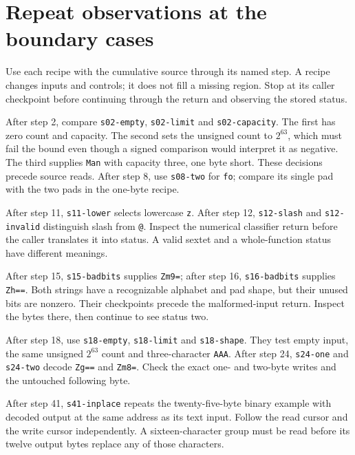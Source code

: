 \section{Repeat observations at the boundary cases}
Use each recipe with the cumulative source through its named step. A recipe changes
inputs and controls; it does not fill a missing region. Stop at its caller checkpoint
before continuing through the return and observing the stored status.

After step 2, compare \texttt{s02-empty}, \texttt{s02-limit} and
\texttt{s02-capacity}. The first has zero count and capacity. The second sets the
unsigned count to \(2^{63}\), which must fail the bound even though a signed comparison
would interpret it as negative. The third supplies \texttt{Man} with capacity three,
one byte short. These decisions precede source reads. After step 8, use
\texttt{s08-two} for \texttt{fo}; compare its single pad with the two pads in the
one-byte recipe.

After step 11, \texttt{s11-lower} selects lowercase \texttt{z}. After step 12,
\texttt{s12-slash} and \texttt{s12-invalid} distinguish slash from \texttt{@}.
Inspect the numerical classifier return before the caller translates it into status.
A valid sextet and a whole-function status have different meanings.

After step 15, \texttt{s15-badbits} supplies \texttt{Zm9=}; after step 16,
\texttt{s16-badbits} supplies \texttt{Zh==}. Both strings have a recognizable alphabet
and pad shape, but their unused bits are nonzero. Their checkpoints precede the
malformed-input return. Inspect the bytes there, then continue to see status two.

After step 18, use \texttt{s18-empty}, \texttt{s18-limit} and
\texttt{s18-shape}. They test empty input, the same unsigned \(2^{63}\) count and
three-character \texttt{AAA}. After step 24, \texttt{s24-one} and
\texttt{s24-two} decode \texttt{Zg==} and \texttt{Zm8=}. Check the exact one- and
two-byte writes and the untouched following byte.

After step 41, \texttt{s41-inplace} repeats the twenty-five-byte binary example with
decoded output at the same address as its text input. Follow the read cursor and the
write cursor independently. A sixteen-character group must be read before its twelve
output bytes replace any of those characters.
